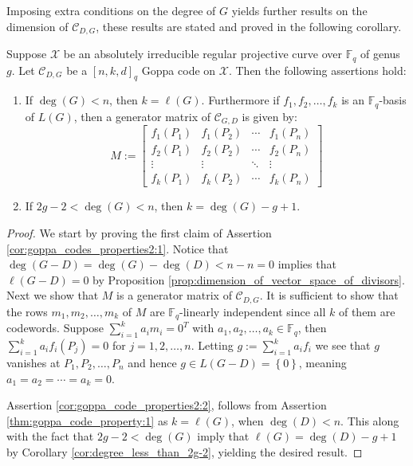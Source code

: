 Imposing extra conditions on the degree of $G$ yields further results on the dimension of $\mathcal{C}_{D, G}$, these results are stated and proved in the following corollary.

\begin{corollary}\label{cor:goppa_code_properties2}
  Suppose $\mathcal{X}$ be an absolutely irreducible regular projective curve over $\mathbb{F}_{q}$ of genus $g$. Let $\mathcal{C}_{D, G}$ be a $[n, k, d]_{q}$ Goppa code on $\mathcal{X}$. Then the following assertions hold:
  \begin{enumerate}
    \item If $\deg(G) < n$, then $k = \ell(G)$. Furthermore if $f_1, f_2, \ldots, f_{k}$ is an $\mathbb{F}_{q}$-basis of $L(G)$, then a generator matrix of $\mathcal{C}_{G, D}$ is given by:
          \begin{equation*}
            M := \begin{bmatrix}
                   f_{1}(P_{1}) & f_{1}(P_{2}) & \cdots & f_{1}(P_{n}) \\
                   f_{2}(P_{1}) & f_{2}(P_{2}) & \cdots & f_{2}(P_{n}) \\
                  \vdots & \vdots & \ddots & \vdots \\
                   f_{k}(P_{1}) & f_{k}(P_{2}) & \cdots & f_{k}(P_{n})
                 \end{bmatrix}
        \end{equation*} \label{cor:goppa_codes_properties2:1}
      \item If $2g - 2 < \deg(G) < n$, then $k = \deg(G) - g + 1$. \label{cor:goppa_code_properties2:2}
  \end{enumerate}
\end{corollary}
\begin{proof}
  We start by proving the first claim of Assertion \ref{cor:goppa_codes_properties2:1}. Notice that $\deg(G - D) = \deg(G) - \deg(D) < n - n = 0$ implies that $\ell(G - D) = 0$ by Proposition \ref{prop:dimension_of_vector_space_of_divisors}. \\ Next we show that $M$ is a generator matrix of $\mathcal{C}_{D, G}$. It is sufficient to show that the rows $m_1, m_2, \ldots, m_{k}$ of $M$ are $\mathbb{F}_{q}$-linearly independent since all $k$ of them are codewords. Suppose $\sum_{i  = 1}^{k} a_{i} m_{i} = 0^{T}$ with $a_1, a_2, \ldots, a_{k} \in \mathbb{F}_{q}$, then $\sum_{i = 1}^{k} a_{i} f_{i}(P_{j}) = 0$ for $j = 1, 2, \ldots, n$. Letting $g := \sum_{i = 1}^{k} a_i f_{i}$ we see that $g$ vanishes at $P_1, P_2, \ldots, P_{n}$ and hence $g \in L(G - D) = \left\{0\right\}$, meaning $a_{1} = a_{2} = \cdots = a_{k} = 0$.

  Assertion \ref{cor:goppa_code_properties2:2}, follows from Assertion \ref{thm:goppa_code_property:1} as $k = \ell(G)$, when $\deg(D) < n$. This along with the fact that $2g - 2 < \deg(G)$ imply that $\ell(G) = \deg(D) - g + 1$ by Corollary \ref{cor:degree_less_than_2g-2}, yielding the desired result.
\end{proof}

